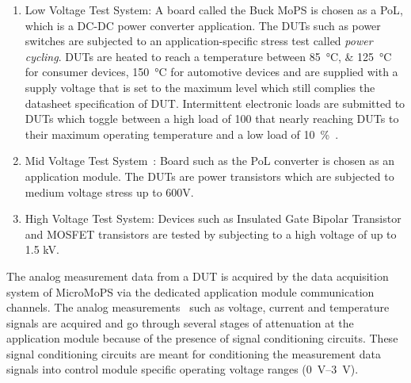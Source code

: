 \begin{enumerate}
\item Low Voltage Test System: A board called the Buck MoPS is chosen as a \gls{PoL}, which is a DC-DC power converter application. 
The \glspl{DUT} such as power switches are subjected to an application-specific stress test called \emph{power cycling}. 
\glspl{DUT} are heated to reach a temperature between \SIlist{85;125}{\celsius} for consumer devices, \SI{150}{\celsius} for automotive devices and are supplied with a supply voltage that is set to the maximum level which still complies the datasheet specification of DUT. 
Intermittent electronic loads are submitted to \glspl{DUT} which toggle between a high load of {100}{\percent} that nearly reaching \glspl{DUT} to their maximum operating temperature and a low load of \SI{10}{\percent}~\cite{Sleik2016}.  
\item Mid Voltage Test System~\cite{Sleik2018a}: Board such as the \acrshort{PoL} converter is chosen as an application module. 
The \acrshort{DUT}s are power transistors which are subjected to medium voltage stress up to 600V.
\item High Voltage Test System: Devices such as Insulated Gate Bipolar Transistor and \gls{MOSFET} transistors are tested by subjecting to a high voltage of up to 1.5 kV.
\end{enumerate}

The analog measurement data from a DUT is acquired by the data acquisition system of MicroMoPS via the dedicated application module communication channels. 
The analog measurements~\cite{Sleik2018a} such as voltage, current and temperature signals are acquired and go through several stages of attenuation at the application module because of the presence of signal conditioning circuits. 
These signal conditioning circuits are meant for conditioning the measurement data signals into control module specific operating voltage ranges (\SIrange{0}{3}{\volt}).             


